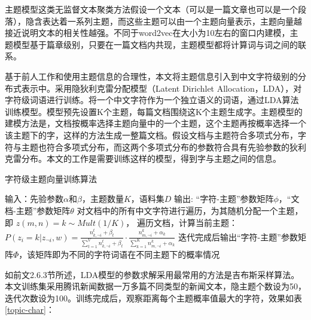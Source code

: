 \documentclass[winfonts,master,oneside,nobackinfo]{njuthesis}
\begin{document}
主题模型这类无监督文本聚类方法假设一个文本（可以是一篇文章也可以是一个段落），隐含表达着一系列主题，而这些主题可以由一个主题向量表示，主题向量越接近说明文本的相关性越强。不同于word2vec在大小为10左右的窗口内建模，主题模型基于篇章级别，只要在一篇文档内共现，主题模型都将计算词与词之间的联系。

基于前人工作和使用主题信息的合理性，本文将主题信息引入到中文字符级别的分布式表示中。采用隐狄利克雷分配模型（Latent Dirichlet Allocation，LDA），对字符级词语进行训练。将一个中文字符作为一个独立语义的词语，通过LDA算法训练模型。模型预先设置K个主题，每篇文档围绕这K个主题生成字。主题模型的建模方法是，文档按概率选择主题向量中的一个主题，这个主题再按概率选择一个该主题下的字，这样的方法生成一整篇文档。假设文档与主题符合多项式分布，字符与主题也符合多项式分布，而这两个多项式分布的参数符合具有先验参数的狄利克雷分布。本文的工作是需要训练这样的模型，得到字与主题之间的信息。
\begin{algorithm}[h]
    \caption{字符级主题向量训练算法}
    \label{alg1}
    \begin{algorithmic}[1]
        \STATE 输入：先验参数$\alpha$和$\beta$，主题数量$K$，语料集$D$
        \STATE 输出: “字符-主题”参数矩阵$\phi$，“文档-主题”参数矩阵$\theta$
        \STATE 对文档中的所有中文字符进行遍历，为其随机分配一个主题，\\即 $z(m,n)=k \sim Mult(1/K )$，  
        \STATE 遍历文档，计算当前主题：\\
        $P(z_i=k|z_{\neg i}, w) = \frac {n_{k, \neg i}^t + \beta_t} { \sum_{t=1}^{V} n_{k,\neg i}^t + \beta_t} \cdot \frac {n_{m,\neg i}^k + \alpha_k} {\sum_{k=1}^{K} n_{m, \neg i}^k + \alpha_k }$
        \STATE 迭代完成后输出“字符-主题”参数矩阵$\Phi$，该矩阵即为不同的字符词语在不同主题下的概率情况
    \end{algorithmic}
\end{algorithm}

如前文2.6.3节所述，LDA模型的参数求解采用最常用的方法是吉布斯采样算法。本文训练集采用腾讯新闻数据一万多篇不同类型的新闻文本，隐主题个数设为50，迭代次数设为100。训练完成后，观察距离每个主题概率值最大的字符，效果如表\ref{topic-char}：
\end{document}

